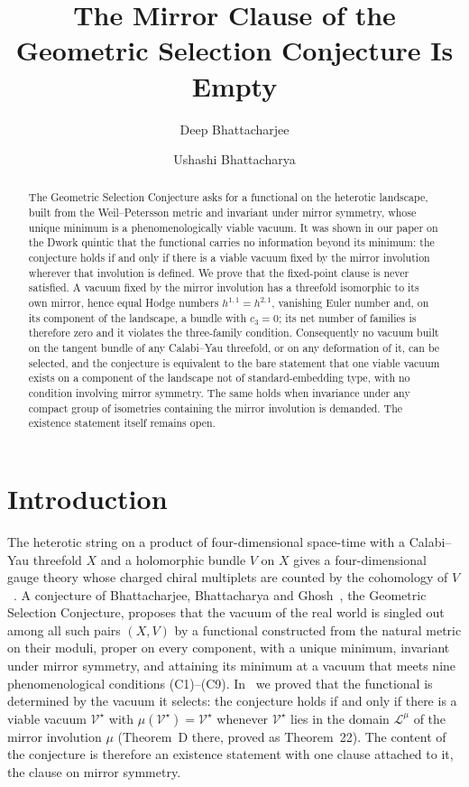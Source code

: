 \documentclass[11pt]{amsart}
\title{The Mirror Clause of the Geometric Selection Conjecture Is Empty}
\author{Deep Bhattacharjee}
\author{Ushashi Bhattacharya}
\theoremstyle{definition}
\theoremstyle{remark}
\newcommand{\cL}{\mathcal{L}}
\newcommand{\cV}{\mathcal{V}}
\begin{document}
\begin{abstract}
The Geometric Selection Conjecture asks for a functional on the heterotic
landscape, built from the Weil--Petersson metric and invariant under mirror
symmetry, whose unique minimum is a phenomenologically viable vacuum. It was
shown in our paper on the Dwork quintic that the functional carries no
information beyond its minimum: the conjecture holds if and only if there is a
viable vacuum fixed by the mirror involution wherever that involution is
defined. We prove that the fixed-point clause is never satisfied. A vacuum fixed
by the mirror involution has a threefold isomorphic to its own mirror, hence
equal Hodge numbers $h^{1,1}=h^{2,1}$, vanishing Euler number and, on its
component of the landscape, a bundle with $c_3=0$; its net number of families is
therefore zero and it violates the three-family condition. Consequently no
vacuum built on the tangent bundle of any Calabi--Yau threefold, or on any
deformation of it, can be selected, and the conjecture is equivalent to the
bare statement that one viable vacuum exists on a component of the landscape
not of standard-embedding type, with no condition involving mirror
symmetry. The same holds when invariance under any compact group of
isometries containing the mirror involution is demanded. The existence
statement itself remains open.
\end{abstract}

\maketitle

\section{Introduction}\label{sec:intro}

The heterotic string on a product of four-dimensional space-time with a
Calabi--Yau threefold $X$ and a holomorphic bundle $V$ on $X$ gives a
four-dimensional gauge theory whose charged chiral multiplets are counted by
the cohomology of $V$~\cite{CHSW85,Wit85}. A conjecture of Bhattacharjee,
Bhattacharya and Ghosh~\cite{Bha26a}, the Geometric Selection Conjecture,
proposes that the vacuum of the real world is singled out among all such pairs
$(X,V)$ by a functional constructed from the natural metric on their moduli,
proper on every component, with a unique minimum, invariant under mirror
symmetry, and attaining its minimum at a vacuum that meets nine
phenomenological conditions (C1)--(C9). In~\cite{BB26} we proved that the
functional is determined by the vacuum it selects: the conjecture holds if and
only if there is a viable vacuum $\cV^\star$ with $\mu(\cV^\star)=\cV^\star$
whenever $\cV^\star$ lies in the domain $\cL^\mu$ of the mirror involution
$\mu$ (Theorem~D there, proved as Theorem~22). The content of the conjecture is therefore an
existence statement with one clause attached to it, the clause on mirror
symmetry.
\end{document}

